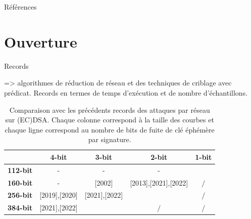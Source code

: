 \documentclass{backend/backend}
\begin{document}
\begin{frame}{Références}
    
    \printbibliography
\end{frame}


\section{Ouverture}

\begin{frame}{Records}


\cite{improvedECDSA} => algorithmes de réduction de réseau et des techniques de criblage avec prédicat. Records en termes de temps d'exécution et de nombre d'échantillons. %

\begin{center}
    \begin{table}[H]
    \centering
    \caption{Comparaison avec les précédents records des attaques par réseau sur (EC)DSA. Chaque colonne correspond à la taille des courbes et chaque ligne correspond au nombre de bits de fuite de clé éphémère par signature.}
    \label{table:comparaison}
    \begin{tabular}{|c|c|c|c|c|}
        \hline
         & \textbf{4-bit} & \textbf{3-bit} & \textbf{2-bit} & \textbf{1-bit} \\
        \hline
        \textbf{112-bit} & - & - & - & \small\cite{improvedECDSA} \\
        \hline
        \textbf{160-bit} & - & [2002] & \small[2013],[2021],[2022] & $/$ \\
        \hline
        \textbf{256-bit} & \small[2019],[2020] & \small[2021],[2022] & \small\cite{improvedECDSA} & $/$ \\
        \hline
        \textbf{384-bit} & \small[2021],[2022] & \small\cite{improvedECDSA} & $/$ & $/$ \\
        \hline
    \end{tabular}
    \end{table}
\end{center}

\end{frame}
\end{document}
